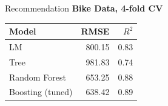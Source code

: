 \documentclass[10pt,compress,t,notes=noshow,xcolor=table]{beamer}
\begin{document}
\begin{framev}[align=top]{Recommendation}
\centering
\textbf{Bike Data, 4-fold CV}\\
\spacer[0.25]
\begin{table}
\centering
\begin{tabular}{lrr}
\hline
Model & RMSE & $R^2$ \\
\hline
LM & 800.15 & 0.83 \\
Tree & 981.83 & 0.74 \\
Random Forest & 653.25 & 0.88 \\
Boosting (tuned) & 638.42 & 0.89 \\
\hline
\end{tabular}
\end{table}
\end{framev}

\endlecture
\end{document}
